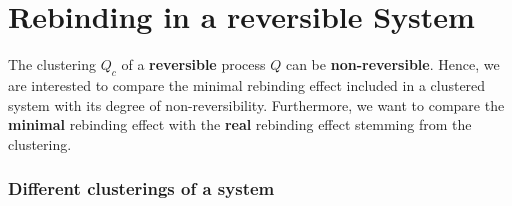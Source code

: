 \section{Rebinding in a reversible System}
\label{sec:example_reversible}

The clustering $Q_c$ of a \textbf{reversible} process $Q$ can be \textbf{non-reversible}. Hence, we are interested to compare the minimal rebinding effect included in a clustered system with its degree of non-reversibility. Furthermore, we want to compare the \textbf{minimal} rebinding effect with the \textbf{real} rebinding effect stemming from the clustering. %

\subsubsection*{Different clusterings of a system}

